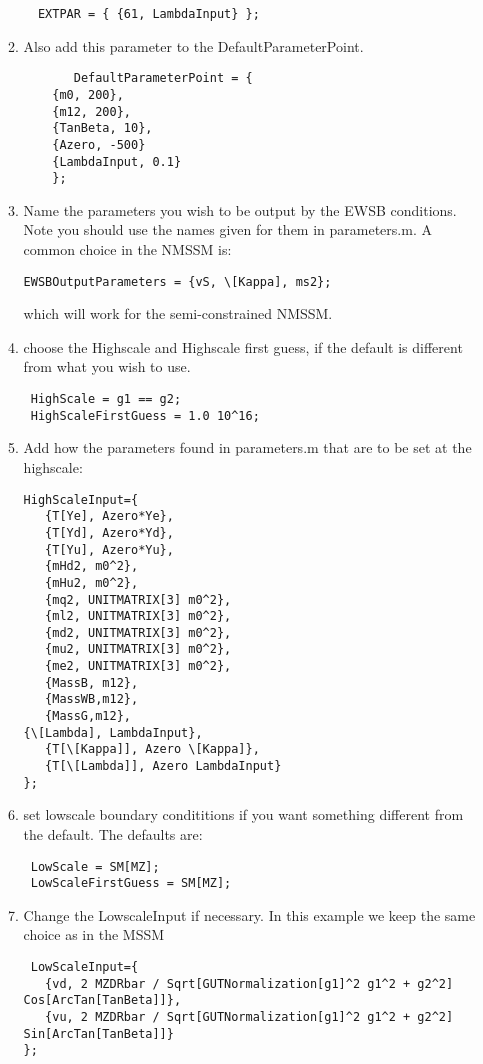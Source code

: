 \documentclass[final,3p,times,pdflatex]{elsarticle}
\begin{document}
\begin{enumerate}
\begin{enumerate}
\begin{lstlisting}
  EXTPAR = { {61, LambdaInput} };
      \end{lstlisting}
     \item Also add this parameter to the DefaultParameterPoint.
      \begin{lstlisting}
       DefaultParameterPoint = {
    {m0, 200},
    {m12, 200},
    {TanBeta, 10},
    {Azero, -500}
    {LambdaInput, 0.1}
    };
  \end{lstlisting}
    \item Name the parameters you wish to be output by the EWSB conditions.  Note you should use the names given for them in parameters.m.    A common choice in the NMSSM is:
\begin{lstlisting}
EWSBOutputParameters = {vS, \[Kappa], ms2};
\end{lstlisting}
which will work for the semi-constrained NMSSM.
\item choose the Highscale and Highscale first guess, if the default is different from what you wish to use.  
\begin{lstlisting} 
 HighScale = g1 == g2;
 HighScaleFirstGuess = 1.0 10^16;
\end{lstlisting}
\item Add how the parameters found in parameters.m that are to be set at the highscale:
\begin{lstlisting} 
HighScaleInput={
   {T[Ye], Azero*Ye},
   {T[Yd], Azero*Yd},
   {T[Yu], Azero*Yu},
   {mHd2, m0^2},
   {mHu2, m0^2},
   {mq2, UNITMATRIX[3] m0^2},
   {ml2, UNITMATRIX[3] m0^2},
   {md2, UNITMATRIX[3] m0^2},
   {mu2, UNITMATRIX[3] m0^2},
   {me2, UNITMATRIX[3] m0^2},
   {MassB, m12},
   {MassWB,m12},
   {MassG,m12},
{\[Lambda], LambdaInput},
   {T[\[Kappa]], Azero \[Kappa]},
   {T[\[Lambda]], Azero LambdaInput}
};
\end{lstlisting}
\item set lowscale boundary condititions if you want something different from the default.  The defaults are:
\begin{lstlisting} 
 LowScale = SM[MZ];
 LowScaleFirstGuess = SM[MZ];
\end{lstlisting}
\item Change the LowscaleInput if necessary.  In this example we keep the same choice as in the MSSM
  \begin{lstlisting} 
 LowScaleInput={
   {vd, 2 MZDRbar / Sqrt[GUTNormalization[g1]^2 g1^2 + g2^2] Cos[ArcTan[TanBeta]]},
   {vu, 2 MZDRbar / Sqrt[GUTNormalization[g1]^2 g1^2 + g2^2] Sin[ArcTan[TanBeta]]}
};
  \end{lstlisting}


\end{enumerate}
\end{enumerate}
\end{document}
